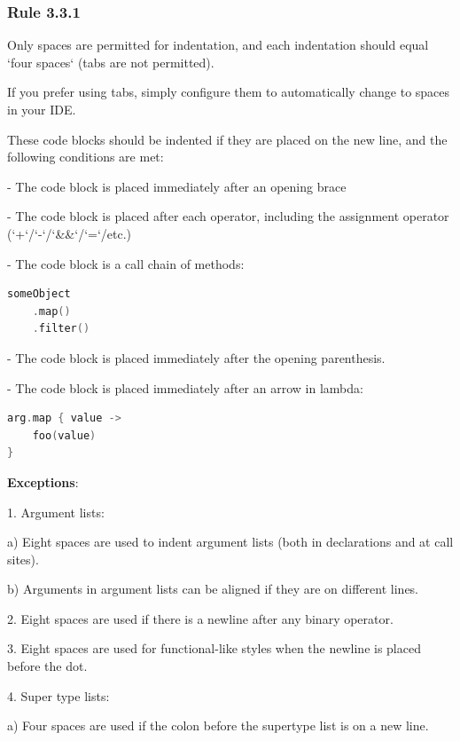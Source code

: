 \subsubsection*{\textbf{Rule 3.3.1}}
\leavevmode\newline



Only spaces are permitted for indentation, and each indentation should equal `four spaces` (tabs are not permitted).

If you prefer using tabs, simply configure them to automatically change to spaces in your IDE.

These code blocks should be indented if they are placed on the new line, and the following conditions are met:

-	The code block is placed immediately after an opening brace

-	The code block is placed after each operator, including the assignment operator (`+`/`-`/`\&\&`/`=`/etc.)

-	The code block is a call chain of methods:

\begin{lstlisting}[language=Kotlin]
someObject
    .map()
    .filter()
\end{lstlisting}
-  The code block is placed immediately after the opening parenthesis.

-  The code block is placed immediately after an arrow in lambda:



\begin{lstlisting}[language=Kotlin]
arg.map { value ->
    foo(value)
}
\end{lstlisting}


\textbf{Exceptions}:

1.	Argument lists: \

a) Eight spaces are used to indent argument lists (both in declarations and at call sites). \

b) Arguments in argument lists can be aligned if they are on different lines.



2.	Eight spaces are used if there is a newline after any binary operator.



3.	Eight spaces are used for functional-like styles when the newline is placed before the dot.



4.	Super type lists: \

a) Four spaces are used if the colon before the supertype list is on a new line. \


